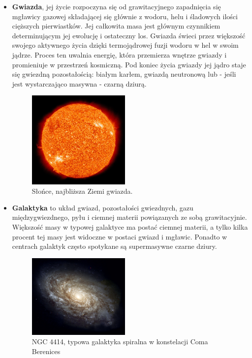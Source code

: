 \documentclass[conference]{IEEEtran}
\begin{document}
\begin{itemize}
    \item \textbf{Gwiazda}, jej życie rozpoczyna się od grawitacyjnego zapadnięcia się mgławicy gazowej składającej się głównie z wodoru, helu i śladowych ilości cięższych pierwiastków. Jej całkowita masa jest głównym czynnikiem determinującym jej ewolucję i ostateczny los. Gwiazda świeci przez większość swojego aktywnego życia dzięki termojądrowej fuzji wodoru w hel w swoim jądrze. Proces ten uwalnia energię, która przemierza wnętrze gwiazdy i promieniuje w przestrzeń kosmiczną. Pod koniec życia gwiazdy jej jądro staje się gwiezdną pozostałością: białym karłem, gwiazdą neutronową lub - jeśli jest wystarczająco masywna - czarną dziurą.
    \begin{figure}[ht]
        \centering
        \includegraphics[width = 5cm]{figures/star.jpg}
        \caption{Słońce, najbliższa Ziemi gwiazda.\cite{star}}
    \end{figure}
    \item \textbf{Galaktyka} to układ gwiazd, pozostałości gwiezdnych, gazu międzygwiezdnego, pyłu i ciemnej materii powiązanych ze sobą grawitacyjnie. Większość masy w typowej galaktyce ma postać ciemnej materii, a tylko kilka procent tej masy jest widoczne w postaci gwiazd i mgławic. Ponadto w centrach galaktyk często spotykane są supermasywne czarne dziury.
    \begin{figure}[ht]
        \centering
        \includegraphics[width = 5cm]{figures/galaxy.jpg}
        \caption{NGC 4414, typowa galaktyka spiralna w konstelacji Coma Berenices\cite{galaxy}}
    \end{figure}

\end{itemize}
\end{document}

